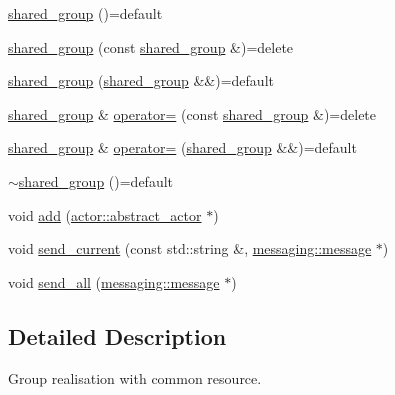 \begin{DoxyCompactItemize}
\item 
\hyperlink{classactor__zeta_1_1environment_1_1shared__group_aee1d8b2f8b57f7e770c19a514cc492f0}{shared\+\_\+group} ()=default
\item 
\hyperlink{classactor__zeta_1_1environment_1_1shared__group_a72a67c42ad9a0632f485055a06e8c455}{shared\+\_\+group} (const \hyperlink{classactor__zeta_1_1environment_1_1shared__group}{shared\+\_\+group} \&)=delete
\item 
\hyperlink{classactor__zeta_1_1environment_1_1shared__group_a646165cadc164fd66152a5b95f09f2e6}{shared\+\_\+group} (\hyperlink{classactor__zeta_1_1environment_1_1shared__group}{shared\+\_\+group} \&\&)=default
\item 
\hyperlink{classactor__zeta_1_1environment_1_1shared__group}{shared\+\_\+group} \& \hyperlink{classactor__zeta_1_1environment_1_1shared__group_a9dcb7f4adcad7c66ac43d65b5800f24d}{operator=} (const \hyperlink{classactor__zeta_1_1environment_1_1shared__group}{shared\+\_\+group} \&)=delete
\item 
\hyperlink{classactor__zeta_1_1environment_1_1shared__group}{shared\+\_\+group} \& \hyperlink{classactor__zeta_1_1environment_1_1shared__group_a00439854585c059d8e4e0fc29ae8c5da}{operator=} (\hyperlink{classactor__zeta_1_1environment_1_1shared__group}{shared\+\_\+group} \&\&)=default
\item 
\hyperlink{classactor__zeta_1_1environment_1_1shared__group_ab77aacd00268bffe1f97fa51d1979d3a}{$\sim$shared\+\_\+group} ()=default
\item 
void \hyperlink{classactor__zeta_1_1environment_1_1shared__group_a70dd0c4545246a60f45f9cba3734720e}{add} (\hyperlink{classactor__zeta_1_1actor_1_1abstract__actor}{actor\+::abstract\+\_\+actor} $\ast$)
\item 
void \hyperlink{classactor__zeta_1_1environment_1_1shared__group_a92fa230ff67cd97226ba57efb43472e2}{send\+\_\+current} (const std\+::string \&, \hyperlink{classactor__zeta_1_1messaging_1_1message}{messaging\+::message} $\ast$)
\item 
void \hyperlink{classactor__zeta_1_1environment_1_1shared__group_ab74c04703451bceb0c517ca5fd4d8e05}{send\+\_\+all} (\hyperlink{classactor__zeta_1_1messaging_1_1message}{messaging\+::message} $\ast$)
\end{DoxyCompactItemize}


\subsection{Detailed Description}
Group realisation with common resource. 

